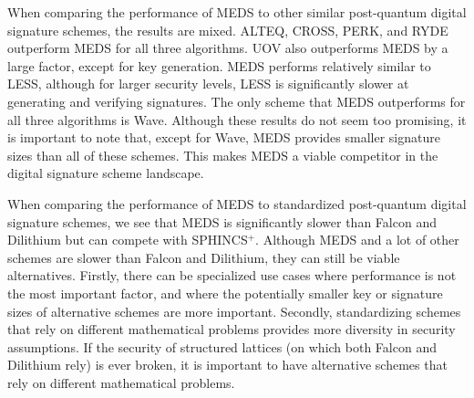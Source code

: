 \documentclass[11pt,a4paper]{report}
\theoremstyle{definition}
\begin{document}
When comparing the performance of MEDS to other similar post-quantum digital signature schemes, the results are mixed. ALTEQ, CROSS, PERK, and RYDE outperform MEDS for all three algorithms. UOV also outperforms MEDS by a large factor, except for key generation. MEDS performs relatively similar to LESS, although for larger security levels, LESS is significantly slower at generating and verifying signatures. The only scheme that MEDS outperforms for all three algorithms is Wave. Although these results do not seem too promising, it is important to note that, except for Wave, MEDS provides smaller signature sizes than all of these schemes. This makes MEDS a viable competitor in the digital signature scheme landscape.

When comparing the performance of MEDS to standardized post-quantum digital signature schemes, we see that MEDS is significantly slower than Falcon and Dilithium but can compete with SPHINCS$^+$. Although MEDS and a lot of other schemes are slower than Falcon and Dilithium, they can still be viable alternatives. Firstly, there can be specialized use cases where performance is not the most important factor, and where the potentially smaller key or signature sizes of alternative schemes are more important. Secondly, standardizing schemes that rely on different mathematical problems provides more diversity in security assumptions. If the security of structured lattices (on which both Falcon and Dilithium rely) is ever broken, it is important to have alternative schemes that rely on different mathematical problems.

\pagebreak
\end{document}
